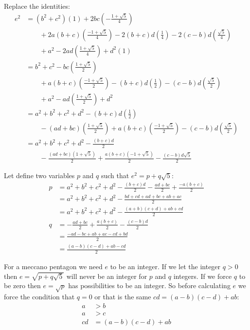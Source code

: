 \documentclass[11pt]{article}
\begin{document}
Replace the identities:
\begin{align*}
e^2 &= (b^2+c^2)(1) + 2bc(-\frac{1 + \sqrt{5}}{4})\\
    &\qquad + 2a(b+c)(\frac{-1+\sqrt{5}}{4}) - 2(b+c)d(\frac{1}{4}) - 2(c-b)d(\frac{\sqrt{5}}{4})\\
    &\qquad + a^2 - 2ad(\frac{1+\sqrt{5}}{4}) + d^2(1)\\
    &= b^2+c^2 - bc(\frac{1 + \sqrt{5}}{2})\\
    &\qquad + a(b+c)(\frac{-1+\sqrt{5}}{2}) - (b+c)d(\frac{1}{2}) - (c-b)d(\frac{\sqrt{5}}{2})\\
    &\qquad + a^2 - ad(\frac{1+\sqrt{5}}{2}) + d^2\\
    &= a^2+b^2+c^2 + d^2 - (b+c)d(\frac{1}{2}) \\
    &\qquad - (ad+bc)(\frac{1 + \sqrt{5}}{2}) + a(b+c)(\frac{-1+\sqrt{5}}{2}) - (c-b)d(\frac{\sqrt{5}}{2})\\
    &= a^2+b^2+c^2 + d^2 - \frac{(b+c)d}{2} \\
    &\qquad - \frac{(ad+bc)(1 + \sqrt{5})}{2} + \frac{a(b+c)(-1+\sqrt{5})}{2} - \frac{(c-b)d\sqrt{5}}{2}
\end{align*}

Let define two variables $p$ and $q$ such that $e^2 = p + q\sqrt{5}$:
\begin{align*}
p &= a^2+b^2+c^2 + d^2 - \frac{(b+c)d}{2} - \frac{ad+bc}{2} + \frac{-a(b+c)}{2}\\
  &= a^2+b^2+c^2 + d^2 - \frac{bd +cd +ad +bc +ab + ac}{2}\\
  &= a^2+b^2+c^2 + d^2 - \frac{(a+b)(c+d)+ab+cd}{2}\\
q &= - \frac{ad+bc}{2} + \frac{a(b+c)}{2} - \frac{(c-b)d}{2}\\
  &= \frac{-ad - bc + ab + ac - cd + bd}{2}\\
  &= \frac{(a-b)(c-d) + ab - cd}{2}
\end{align*}

For a meccano pentagon we need $e$ to be an integer. If we let the integer $q > 0$ then $e = \sqrt{p + q\sqrt{5}}$ will never be an integer for $p$ and $q$ integers. If we force $q$ to be zero then $e = \sqrt{p}$ has possibilities to be an integer.
So before calculating $e$ we force the condition that $q = 0$ or that is the same $cd = (a-b)(c-d)+ab$:
\begin{align*}
a  & > b\\
a  & > c\\
cd &= (a-b)(c-d)+ab\\
\end{align*}
\end{document}
